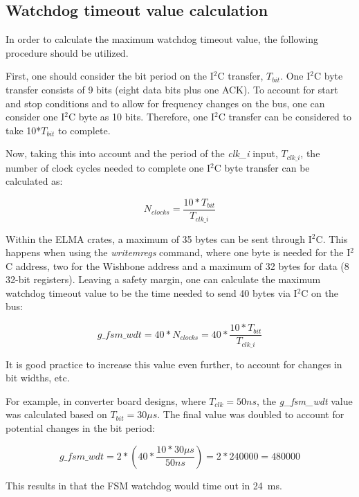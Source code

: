 \documentclass[a4paper,11pt]{article}
\begin{document}
\pagebreak
\begin{appendices}

\section{Watchdog timeout value calculation}
\label{app:wdto-calc}

In order to calculate the maximum watchdog timeout value, the following procedure
should be utilized.

First, one should consider the bit period on the I$^2$C transfer, $T_{bit}$. One I$^2$C
byte transfer consists of 9 bits (eight data bits plus one ACK). To account for start
and stop conditions and to allow for frequency changes on the bus, one can consider
one I$^2$C byte as 10 bits. Therefore, one I$^2$C transfer can be considered to take
10*$T_{bit}$ to complete.

Now, taking this into account and the period of the \textit{clk\_i} input,
$T_{clk\_i}$, the number of clock cycles needed to complete one I$^2$C byte transfer
can be calculated as:

\begin{equation}
N_{clocks} = \frac{10*T_{bit}}{T_{clk\_i}}
\end{equation}

Within the ELMA crates, a maximum of 35 bytes can be sent through I$^2$C. This
happens when using the \textit{writemregs} command, where one byte is needed
for the I$^2$C address, two for the Wishbone address and a maximum of 32 bytes for
data (8 32-bit registers). Leaving a safety margin, one can calculate the
maximum watchdog timeout value to be the time needed to send 40 bytes via I$^2$C
on the bus:

\begin{equation}
g\_fsm\_wdt = 40 * N_{clocks} = 40 * \frac{10*T_{bit}}{T_{clk\_i}}
\end{equation}

It is good practice to increase this value even further, to account for changes
in bit widths, etc.

For example, in converter board designs, where $T_{clk} = 50ns$, the
\textit{g\_fsm\_wdt} value was calculated based on $T_{bit} = 30{\mu}s$.
The final value was doubled to account for potential changes in the bit period:

\begin{equation}
g\_fsm\_wdt = 2 * \left( 40 * \frac{10*30{\mu}s}{50ns} \right) = 2 * 240000 = 480000
\end{equation}

This results in that the FSM watchdog would time out in 24~ms.

\end{appendices}

\pagebreak


\end{document}
